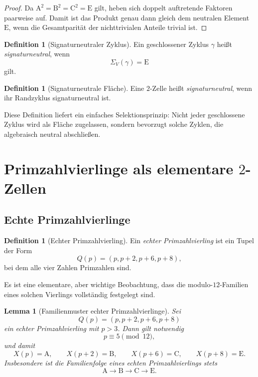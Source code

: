 \documentclass[11pt,a4paper]{article}
\newtheorem{lemma}[theorem]{Lemma}
\theoremstyle{definition}
\newtheorem{definition}[theorem]{Definition}
\theoremstyle{remark}
\newcommand{\Efam}{\mathrm{E}}
\newcommand{\Afam}{\mathrm{A}}
\newcommand{\Bfam}{\mathrm{B}}
\newcommand{\Cfam}{\mathrm{C}}
\begin{document}
	\begin{proof}
		Da $\Afam^2=\Bfam^2=\Cfam^2=\Efam$ gilt, heben sich doppelt auftretende Faktoren paarweise auf. Damit ist das Produkt genau dann gleich dem neutralen Element $\Efam$, wenn die Gesamtparität der nichttrivialen Anteile trivial ist.
	\end{proof}
	
	\begin{definition}[Signaturneutraler Zyklus]
		Ein geschlossener Zyklus $\gamma$ heißt \emph{signaturneutral}, wenn
		\[
		\Sigma_V(\gamma)=\Efam
		\]
		gilt.
	\end{definition}
	
	\begin{definition}[Signaturneutrale Fläche]
		Eine $2$-Zelle heißt \emph{signaturneutral}, wenn ihr Randzyklus signaturneutral ist.
	\end{definition}
	
	Diese Definition liefert ein einfaches Selektionsprinzip: Nicht jeder geschlossene Zyklus wird als Fläche zugelassen, sondern bevorzugt solche Zyklen, die algebraisch neutral abschließen.
	
	\section{Primzahlvierlinge als elementare $2$-Zellen}
	
	\subsection{Echte Primzahlvierlinge}
	
	\begin{definition}[Echter Primzahlvierling]
		Ein \emph{echter Primzahlvierling} ist ein Tupel der Form
		\[
		Q(p)=(p,p+2,p+6,p+8),
		\]
		bei dem alle vier Zahlen Primzahlen sind.
	\end{definition}
	
	Es ist eine elementare, aber wichtige Beobachtung, dass die modulo-$12$-Familien eines solchen Vierlings vollständig festgelegt sind.
	
	\begin{lemma}[Familienmuster echter Primzahlvierlinge]
		Sei
		\[
		Q(p)=(p,p+2,p+6,p+8)
		\]
		ein echter Primzahlvierling mit $p>3$. Dann gilt notwendig
		\[
		p\equiv 5\pmod{12},
		\]
		und damit
		\[
		X(p)=\Afam,\qquad X(p+2)=\Bfam,\qquad X(p+6)=\Cfam,\qquad X(p+8)=\Efam.
		\]
		Insbesondere ist die Familienfolge eines echten Primzahlvierlings stets
		\[
		\Afam\to\Bfam\to\Cfam\to\Efam.
		\]
	\end{lemma}
	
\end{document}
